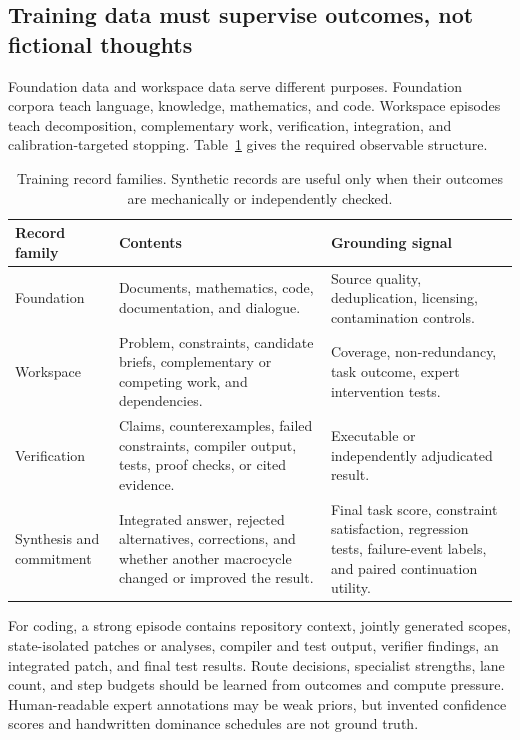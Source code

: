 \documentclass[10pt,a4paper]{article}
\begin{document}
\subsection{Training data must supervise outcomes, not fictional thoughts}

Foundation data and workspace data serve different purposes. Foundation
corpora teach language, knowledge, mathematics, and code. Workspace episodes
teach decomposition, complementary work, verification, integration, and
calibration-targeted stopping. Table~\ref{tab:data} gives the required
observable structure.

\begin{table}[htbp]
\caption{Training record families. Synthetic records are useful only when
their outcomes are mechanically or independently checked.}
\label{tab:data}
\centering\small
\begin{tabularx}{\textwidth}{@{}lXX@{}}
\toprule
\textbf{Record family} & \textbf{Contents} & \textbf{Grounding signal} \\
\midrule
Foundation & Documents, mathematics, code, documentation, and dialogue. & Source quality, deduplication, licensing, contamination controls. \\
Workspace & Problem, constraints, candidate briefs, complementary or competing work, and dependencies. & Coverage, non-redundancy, task outcome, expert intervention tests. \\
Verification & Claims, counterexamples, failed constraints, compiler output, tests, proof checks, or cited evidence. & Executable or independently adjudicated result. \\
Synthesis and commitment & Integrated answer, rejected alternatives, corrections, and whether another macrocycle changed or improved the result. & Final task score, constraint satisfaction, regression tests, failure-event labels, and paired continuation utility. \\
\bottomrule
\end{tabularx}
\end{table}

For coding, a strong episode contains repository context, jointly generated
scopes, state-isolated patches or analyses, compiler and test output, verifier
findings, an integrated patch, and final test results. Route decisions,
specialist strengths, lane count, and step budgets should be learned from
outcomes and compute pressure. Human-readable expert annotations may be weak
priors, but invented confidence scores and handwritten dominance schedules are
not ground truth.
\end{document}
